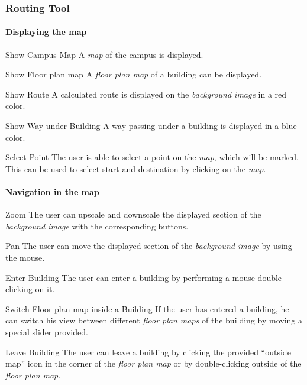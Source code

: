 
\subsubsection{Routing Tool}
\paragraph{Displaying the map}
\begin{numerate}[FMR]
	\item[Show Campus Map]
	A \textit{map} of the campus is displayed.
	\item[Show Floor plan map]
	A \textit{floor plan map} of a building can be displayed.
	\item[Show Route]
	A calculated route is displayed on the \textit{background image} in a red color.
	\item[Show Way under Building]
	A way passing under a building is displayed in a blue color.
	\item[Select Point]
	The user is able to select a point on the \textit{map}, which will be marked. This can be used to select start and destination by clicking on the \textit{map}.


\end{numerate}

\paragraph{Navigation in the map}
\begin{numerate}[FMR]
	\item[Zoom]
	The user can upscale and downscale the displayed section of the \textit{background image} with the corresponding buttons.
	\item[Pan]
	The user can move the displayed section of the \textit{background image} by using the mouse.
	\item[Enter Building]
	The user can enter a building by performing a mouse double-clicking on it.
	\item[Switch Floor plan map inside a Building]
	If the user has entered a building, he can switch his view between different \textit{floor plan maps} of the building by moving a special slider provided.
	\item[Leave Building]
	The user can leave a building by clicking the provided ``outside map'' icon in the corner of the \textit{floor plan map} or by double-clicking outside of the \textit{floor plan map}.
\end{numerate}

